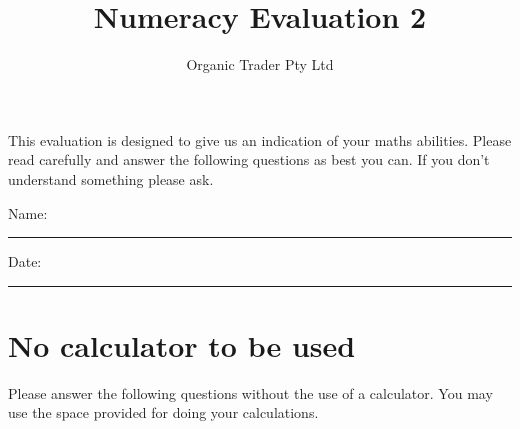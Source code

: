 \documentclass[a4paper]{article}
\begin{document}
\newcommand{\answer}[1]{
  \textcolor{red}{#1}
}
\ifdefined\showanswers
\else
  \renewcommand{\answer}[1]{}
\fi


\title{Numeracy Evaluation 2 \answer{with answers}}
\author{Organic Trader Pty Ltd}

\maketitle
\noindent This evaluation is designed to give us an indication of your
maths abilities. Please read carefully and answer the following questions as best you
can. If you don't understand something please ask.

\hspace{5mm}

\noindent Name: \rule{3cm}{0.2pt}

\hspace{5mm}

\noindent Date: \rule{3cm}{0.2pt}



\section{No calculator to be used}

Please answer the following questions without the use of a calculator. You may use the space provided for doing your calculations.
\end{document}
